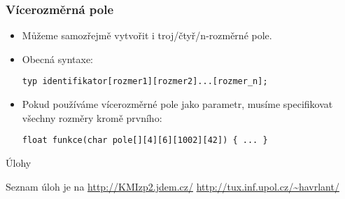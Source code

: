 \documentclass{beamer}
\newenvironment{itemizex}%
  {\large \begin{itemize}%
    \setlength{\itemsep}{8pt}%
    \setlength{\parskip}{8pt}}%
  {\end{itemize}}
\begin{document}
\begin{frame}[t,fragile]\frametitle{Vícerozměrná pole} 
    \vskip 1cm
    \begin{itemizex}
        \item Můžeme samozřejmě vytvořit i troj/čtyř/n-rozměrné pole.
        \item Obecná syntaxe:
\begin{verbatim} 
typ identifikator[rozmer1][rozmer2]...[rozmer_n];
\end{verbatim}
        \item Pokud používáme vícerozměrné pole jako parametr, musíme specifikovat všechny rozměry kromě prvního:
\begin{verbatim} 
float funkce(char pole[][4][6][1002][42]) { ... }
\end{verbatim}
    \end{itemizex}
\end{frame}


\begin{frame}[t,fragile]{Úlohy}
\begin{center}
\vskip 1cm
{\Large Seznam úloh je na \url{http://KMIzp2.jdem.cz/}}
\vskip 2cm
\url{http://tux.inf.upol.cz/~havrlant/}
\end{center}
\end{frame}
\end{document}
